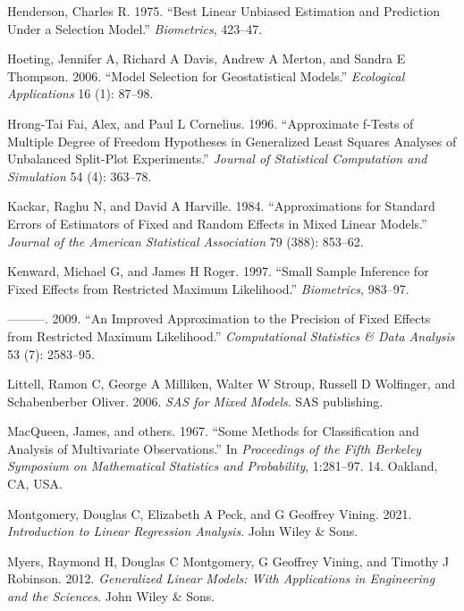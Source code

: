 \documentclass{article}
\newlength{\cslhangindent}
\newlength{\cslentryspacingunit} %
\newenvironment{CSLReferences}[2] %
 {%
  \setlength{\parindent}{0pt}
  \ifodd #1
  \let\oldpar\par
  \def\par{\hangindent=\cslhangindent\oldpar}
  \fi
  \setlength{\parskip}{#2\cslentryspacingunit}
 }%
 {}
\begin{document}
\begin{CSLReferences}{1}{0}
\leavevmode\hypertarget{ref-henderson1975best}{}%
Henderson, Charles R. 1975. {``Best Linear Unbiased Estimation and
Prediction Under a Selection Model.''} \emph{Biometrics}, 423--47.

\leavevmode\hypertarget{ref-hoeting2006model}{}%
Hoeting, Jennifer A, Richard A Davis, Andrew A Merton, and Sandra E
Thompson. 2006. {``Model Selection for Geostatistical Models.''}
\emph{Ecological Applications} 16 (1): 87--98.

\leavevmode\hypertarget{ref-hrong1996approximate}{}%
Hrong-Tai Fai, Alex, and Paul L Cornelius. 1996. {``Approximate f-Tests
of Multiple Degree of Freedom Hypotheses in Generalized Least Squares
Analyses of Unbalanced Split-Plot Experiments.''} \emph{Journal of
Statistical Computation and Simulation} 54 (4): 363--78.

\leavevmode\hypertarget{ref-kackar1984approximations}{}%
Kackar, Raghu N, and David A Harville. 1984. {``Approximations for
Standard Errors of Estimators of Fixed and Random Effects in Mixed
Linear Models.''} \emph{Journal of the American Statistical Association}
79 (388): 853--62.

\leavevmode\hypertarget{ref-kenward1997small}{}%
Kenward, Michael G, and James H Roger. 1997. {``Small Sample Inference
for Fixed Effects from Restricted Maximum Likelihood.''}
\emph{Biometrics}, 983--97.

\leavevmode\hypertarget{ref-kenward2009improved}{}%
---------. 2009. {``An Improved Approximation to the Precision of Fixed
Effects from Restricted Maximum Likelihood.''} \emph{Computational
Statistics \& Data Analysis} 53 (7): 2583--95.

\leavevmode\hypertarget{ref-littell2006sas}{}%
Littell, Ramon C, George A Milliken, Walter W Stroup, Russell D
Wolfinger, and Schabenberber Oliver. 2006. \emph{SAS for Mixed Models}.
SAS publishing.

\leavevmode\hypertarget{ref-macqueen1967some}{}%
MacQueen, James, and others. 1967. {``Some Methods for Classification
and Analysis of Multivariate Observations.''} In \emph{Proceedings of
the Fifth Berkeley Symposium on Mathematical Statistics and
Probability}, 1:281--97. 14. Oakland, CA, USA.

\leavevmode\hypertarget{ref-montgomery2021introduction}{}%
Montgomery, Douglas C, Elizabeth A Peck, and G Geoffrey Vining. 2021.
\emph{Introduction to Linear Regression Analysis}. John Wiley \& Sons.

\leavevmode\hypertarget{ref-myers2012generalized}{}%
Myers, Raymond H, Douglas C Montgomery, G Geoffrey Vining, and Timothy J
Robinson. 2012. \emph{Generalized Linear Models: With Applications in
Engineering and the Sciences}. John Wiley \& Sons.


\end{CSLReferences}
\end{document}
